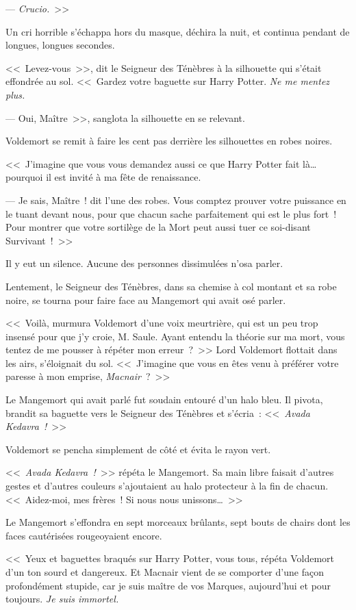 --- \emph{Crucio.}~>>

Un cri horrible s'échappa hors du masque, déchira la nuit, et continua pendant de longues, longues secondes.

<<~Levez-vous~>>, dit le Seigneur des Ténèbres à la silhouette qui s'était effondrée au sol. <<~Gardez votre baguette sur Harry Potter. \emph{Ne me mentez plus.}

--- Oui, Maître~>>, sanglota la silhouette en se relevant.

Voldemort se remit à faire les cent pas derrière les silhouettes en robes noires.

<<~J'imagine que vous vous demandez aussi ce que Harry Potter fait là… pourquoi il est invité à ma fête de renaissance.

--- Je sais, Maître~! dit l'une des robes. Vous comptez prouver votre puissance en le tuant devant nous, pour que chacun sache parfaitement qui est le plus fort~! Pour montrer que votre sortilège de la Mort peut aussi tuer ce soi-disant Survivant~!~>>

Il y eut un silence. Aucune des personnes dissimulées n'osa parler.

Lentement, le Seigneur des Ténèbres, dans sa chemise à col montant et sa robe noire, se tourna pour faire face au Mangemort qui avait osé parler.

<<~Voilà, murmura Voldemort d'une voix meurtrière, qui est un peu trop insensé pour que j'y croie, M. Saule. Ayant entendu la théorie sur ma mort, vous tentez de me pousser à répéter mon erreur~?~>> Lord Voldemort flottait dans les airs, s'éloignait du sol. <<~J'imagine que vous en êtes venu à préférer votre paresse à mon emprise, \emph{Macnair}~?~>>

Le Mangemort qui avait parlé fut soudain entouré d'un halo bleu. Il pivota, brandit sa baguette vers le Seigneur des Ténèbres et s'écria~: <<~\emph{Avada Kedavra~!}~>>

Voldemort se pencha simplement de côté et évita le rayon vert.

<<~\emph{Avada Kedavra~!}~>> répéta le Mangemort. Sa main libre faisait d'autres gestes et d'autres couleurs s'ajoutaient au halo protecteur à la fin de chacun. <<~Aidez-moi, mes frères~! Si nous nous unissons…~>>

Le Mangemort s'effondra en sept morceaux brûlants, sept bouts de chairs dont les faces cautérisées rougeoyaient encore.

<<~Yeux et baguettes braqués sur Harry Potter, vous tous, répéta Voldemort d'un ton sourd et dangereux. Et Macnair vient de se comporter d'une façon profondément stupide, car je suis maître de vos Marques, aujourd'hui et pour toujours. \emph{Je suis immortel.}

